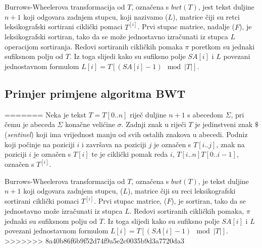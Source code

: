 \documentclass{ferseminar}
\begin{document}
Burrows-Wheelerova transformacija od $T$, ozna\v{c}ena s $bwt(T)$, jest tekst duljine $n+1$ koji odgovara zadnjem stupcu, koji nazivamo ($L$), matrice čiji su retci leksikografski sortirani ciklički pomaci $T^{[i]}$. Prvi stupac matrice, nadalje ($F$), je leksikografski sortiran, tako da se može jednostavno izračunati iz stupca $L$ operacijom sortiranja. Redovi sortiranih cikličkih pomaka $\pi$ poretkom su jednaki sufiksnom polju od $T$. Iz toga slijedi kako su sufiksno polje $SA[i]$ i $L$ povezani jednostavnom formulom $L[i]= T[(SA[i]-1) \mod |T|]$.

\subsection{Primjer primjene algoritma BWT}
=======
Neka je tekst $T=T[0..n]$ riječ duljine $n+1$ s abecedom $\Sigma$, pri čemu je abeceda $\Sigma$ konačne velićine $\sigma$. Zadnji znak u riječi $T$ je jedinstveni znak $\$$ (\textit{sentinel}) koji ima vrijednost manju od svih ostalih znakova u abecedi.  Podniz koji počinje na poziciji $i$ i završava na poziciji $j$ je označen s $T[i..j]$, znak na poziciji $i$ je označen s $T[i]$ te je ciklički pomak reda $i$,  $T[i..n]T[0..i-1]$, označen s $T^{[i]}$.

Burrows-Wheelerova transformacija od $T$, označena s $bwt(T)$, je tekst duljine $n+1$ koji odgovara zadnjem stupcu, ($L$), matrice čiji su reci leksikografski sortirani ciklički pomaci $T^{[i]}$. Prvi stupac matrice, ($F$), je sortiran, tako da se jednostavno može izračunati iz stupca $L$. Redovi sortiranih cikličkih pomaka, $\pi$ jednaki su sufiksnom polju od $T$. Iz toga slijedi kako su sufiksno polje $SA[i]$ i $L$ povezani jednostavnom formulom $L[i]= T[(SA[i]-1) \mod |T|]$.
>>>>>>> 8a40b86f6b9f52d74f9a5e2c0035b9d3a7720da3
\end{document}
